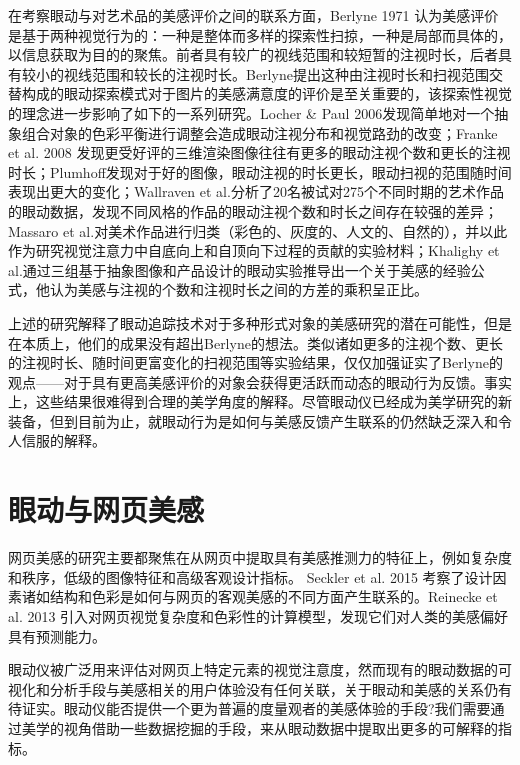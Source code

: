在考察眼动与对艺术品的美感评价之间的联系方面，Berlyne 1971 认为美感评价是基于两种视觉行为的：一种是整体而多样的探索性扫掠，一种是局部而具体的，以信息获取为目的的聚焦。前者具有较广的视线范围和较短暂的注视时长，后者具有较小的视线范围和较长的注视时长。Berlyne提出这种由注视时长和扫视范围交替构成的眼动探索模式对于图片的美感满意度的评价是至关重要的，该探索性视觉的理念进一步影响了如下的一系列研究。Locher \& Paul 2006发现简单地对一个抽象组合对象的色彩平衡进行调整会造成眼动注视分布和视觉路劲的改变；Franke et al. 2008 发现更受好评的三维渲染图像往往有更多的眼动注视个数和更长的注视时长；Plumhoff发现对于好的图像，眼动注视的时长更长，眼动扫视的范围随时间表现出更大的变化；Wallraven et al.分析了20名被试对275个不同时期的艺术作品的眼动数据，发现不同风格的作品的眼动注视个数和时长之间存在较强的差异；Massaro et al.对美术作品进行归类（彩色的、灰度的、人文的、自然的），并以此作为研究视觉注意力中自底向上和自顶向下过程的贡献的实验材料；Khalighy et al.通过三组基于抽象图像和产品设计的眼动实验推导出一个关于美感的经验公式，他认为美感与注视的个数和注视时长之间的方差的乘积呈正比。

上述的研究解释了眼动追踪技术对于多种形式对象的美感研究的潜在可能性，但是在本质上，他们的成果没有超出Berlyne的想法。类似诸如更多的注视个数、更长的注视时长、随时间更富变化的扫视范围等实验结果，仅仅加强证实了Berlyne的观点——对于具有更高美感评价的对象会获得更活跃而动态的眼动行为反馈。事实上，这些结果很难得到合理的美学角度的解释。尽管眼动仪已经成为美学研究的新装备，但到目前为止，就眼动行为是如何与美感反馈产生联系的仍然缺乏深入和令人信服的解释。


\section{眼动与网页美感}
网页美感的研究主要都聚焦在从网页中提取具有美感推测力的特征上，例如复杂度和秩序，低级的图像特征和高级客观设计指标。
Seckler et al. 2015 考察了设计因素诸如结构和色彩是如何与网页的客观美感的不同方面产生联系的。Reinecke et al. 2013 引入对网页视觉复杂度和色彩性的计算模型，发现它们对人类的美感偏好具有预测能力。

眼动仪被广泛用来评估对网页上特定元素的视觉注意度，然而现有的眼动数据的可视化和分析手段与美感相关的用户体验没有任何关联，关于眼动和美感的关系仍有待证实。眼动仪能否提供一个更为普遍的度量观者的美感体验的手段?我们需要通过美学的视角借助一些数据挖掘的手段，来从眼动数据中提取出更多的可解释的指标。



